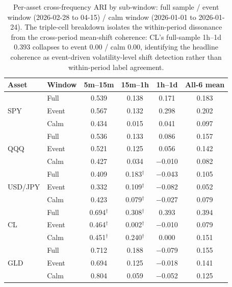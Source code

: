 \documentclass[preprint,12pt,authoryear]{elsarticle}
\begin{document}
\begin{table}[!htbp]
\centering
\small
\setlength{\tabcolsep}{4pt}
\caption{Per-asset cross-frequency ARI by sub-window: full sample / event window (2026-02-28 to 04-15) / calm window (2026-01-01 to 2026-01-24). The triple-cell breakdown isolates the within-period dissonance from the cross-period mean-shift coherence: CL's full-sample 1h--1d 0.393 collapses to event 0.00 / calm 0.00, identifying the headline coherence as event-driven volatility-level shift detection rather than within-period label agreement.}
\label{tab:cross_freq_subwindow}
\begin{tabular}{llcccc}
\toprule
Asset & Window & 5m--15m & 15m--1h & 1h--1d & All-6 mean \\
\midrule
\multirow{3}{*}{SPY}
  & Full   & 0.539 & 0.138            & 0.171    & 0.183 \\
  & Event  & 0.567 & 0.132            & 0.298    & 0.202 \\
  & Calm   & 0.434 & 0.015            & 0.041    & 0.097 \\[3pt]
\multirow{3}{*}{QQQ}
  & Full   & 0.536 & 0.133            & 0.086    & 0.157 \\
  & Event  & 0.521 & 0.125            & 0.056    & 0.142 \\
  & Calm   & 0.427 & 0.034            & $-$0.010 & 0.082 \\[3pt]
\multirow{3}{*}{USD/JPY}
  & Full   & 0.409 & 0.183$^\dagger$  & $-$0.043 & 0.105 \\
  & Event  & 0.332 & 0.109$^\dagger$  & $-$0.082 & 0.052 \\
  & Calm   & 0.423 & 0.079$^\dagger$  & $-$0.027 & 0.079 \\[3pt]
\multirow{3}{*}{CL}
  & Full   & 0.694$^\dagger$ & 0.308$^\dagger$  & 0.393    & 0.394 \\
  & Event  & 0.464$^\dagger$ & 0.002$^\dagger$  & $-$0.010 & 0.079 \\
  & Calm   & 0.451$^\dagger$ & 0.240$^\dagger$  & 0.000    & 0.151 \\[3pt]
\multirow{3}{*}{GLD}
  & Full   & 0.712 & 0.188            & $-$0.079 & 0.155 \\
  & Event  & 0.694 & 0.125            & $-$0.018 & 0.141 \\
  & Calm   & 0.804 & 0.059            & $-$0.052 & 0.125 \\

\end{tabular}
\end{table}
\end{document}
